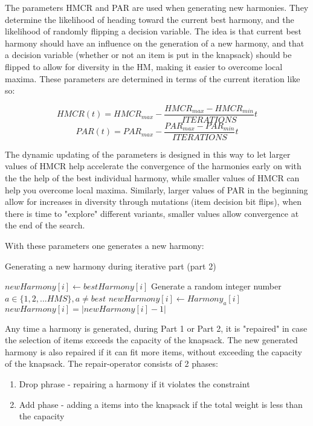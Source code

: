 \documentclass[titlepage]{article}
\begin{document}
The parameters HMCR and PAR are used when generating new harmonies. They determine the likelihood of heading toward the current best harmony, and the likelihood of randomly flipping a decision variable. The idea is that current best harmony should have an influence on the generation of a new harmony, and that a decision variable (whether or not an item is put in the knapsack) should be flipped to allow for diversity in the HM, making it easier to overcome local maxima. These parameters are determined in terms of the current iteration like so:

\begin{equation}
    HMCR(t) = HMCR_{max} - \frac{HMCR_{max}-HMCR_{min}}{ITERATIONS} t
\end{equation}
\begin{equation}
    PAR(t) = PAR_{max} - \frac{PAR_{max}-PAR_{min}}{ITERATIONS} t
\end{equation}

The dynamic updating of the parameters is designed in this way to let larger values of HMCR help accelerate the convergence of the harmonies early on with the the help of the best individual harmony, while smaller values of HMCR can help you overcome local maxima. Similarly, larger values of PAR in the beginning allow for increases in diversity through mutations (item decision bit flips), when there is time to "explore" different variants, smaller values allow convergence at the end of the search. 

With these parameters one generates a new harmony:

\begin{algorithm}
\caption{Generating a new harmony during iterative part (part 2)}\label{harmonyGen}
    \begin{algorithmic}
                \State $newHarmony[i] \gets bestHarmony[i]$ 
            \Else
                \State Generate a random integer number $a \in \{1, 2, ... HMS\}, a \neq best$
                \State $newHarmony[i] \gets Harmony_{a}[i]$ 
                    \State $newHarmony[i] = |newHarmony[i]-1|$ 
                \EndIf
            \EndIf
        \EndFor
    \end{algorithmic}
\end{algorithm}


Any time a harmony is generated, during Part 1 or Part 2, it is "repaired" in case the selection of items exceeds the capacity of the knapsack. The new generated harmony is also repaired if it can fit more items, without exceeding the capacity of the knapsack. The repair-operator consists of 2 phases:
\begin{enumerate}
    \item Drop phrase - repairing a harmony if it violates the constraint
    \item Add phase - adding a items into the knapsack if the total weight is less than the capacity
\end{enumerate}
\end{document}
